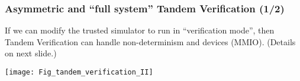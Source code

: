 \begin{frame}[fragile]
\frametitle{Asymmetric and ``full system'' Tandem Verification (1/2)}

\footnotesize

If we can modify the trusted simulator to run in ``verification
mode'', then Tandem Verification can handle non-determinism and
devices (MMIO).  \hmm (Details on next slide.)

\vxx

\begin{center}
\begin{minipage}{0.7\textwidth}
  \texttt{[image: Fig\_tandem\_verification\_II]}
\end{minipage}
\end{center}

\end{frame}


